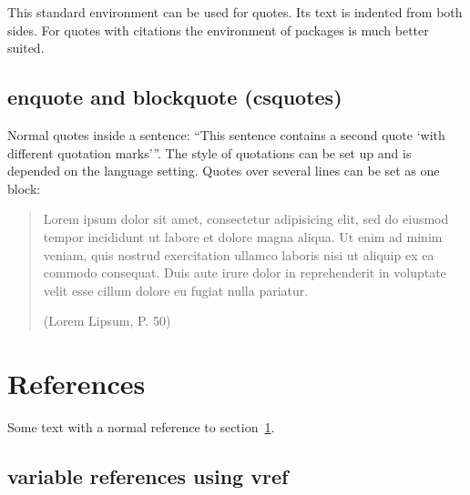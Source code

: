 This standard environment can be used for quotes. Its text is indented from both sides. For quotes with citations the  environment of packages  is much better suited.

%

\subsection{enquote and blockquote (csquotes)}

\begin{filecontents*}{\democodefile}
Normal quotes inside a sentence: \enquote{This sentence contains a second
quote \enquote{with different quotation marks}}. The style of
quotations can be set up and is depended on the language setting. 
Quotes over several lines can be set as one block: \blockquote[(Lorem Lipsum,
P. 50)]{Lorem ipsum dolor sit amet, consectetur adipisicing elit, sed do
eiusmod tempor incididunt ut labore et dolore magna aliqua. Ut enim ad minim
veniam, quis nostrud exercitation ullamco laboris nisi ut aliquip ex ea
commodo consequat. Duis aute irure dolor in reprehenderit in voluptate velit
esse cillum dolore eu fugiat nulla pariatur.}
\end{filecontents*}

%

%
\section{References}
\label{sec:references}

\begin{filecontents*}{\democodefile}
Some text with a normal reference 
to section~\ref{sec:references}.
\end{filecontents*}

%

\subsection{variable references using vref}

